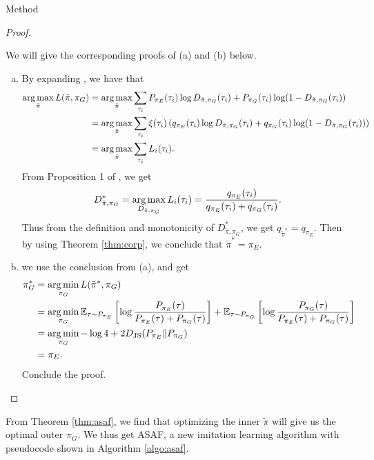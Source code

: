 \documentclass[10pt,aspectratio=169]{beamer}
\begin{document}
\begin{frame}{Method}
\begin{proof}
\begin{enumerate}[(a)]
		\end{enumerate}
		We will give the corresponding proofs of (a) and (b) below.
		\begin{enumerate}[(a)]
			\item By expanding , we have that
			      \[
				      \begin{aligned}
					      \operatorname*{arg\,max}_{\tilde{\pi}} L(\tilde{\pi}, \pi_G)
					       & = \operatorname*{arg\,max}_{\tilde{\pi}} \sum_{\tau_i} P_{\pi_E}(\tau_i)\log D_{\tilde{\pi}, \pi_G}(\tau_i) + P_{\pi_G}(\tau_i)\log(1-D_{\tilde{\pi}, \pi_G}(\tau_i))                         \\
					       & = \operatorname*{arg\,max}_{\tilde{\pi}} \sum_{\tau_i} \xi(\tau_i)\left(q_{\pi_E}(\tau_i)\log D_{\tilde{\pi}, \pi_G}(\tau_i) + q_{\pi_G}(\tau_i)\log(1-D_{\tilde{\pi}, \pi_G}(\tau_i))\right) \\
					       & = \operatorname*{arg\,max}_{\tilde{\pi}} \sum_{\tau_i} L_i(\tau_i).
				      \end{aligned}
			      \]
			      From Proposition 1 of \citep{gan}, we get
			      \[
				      D_{\tilde{\pi}, \pi_G}^* = \operatorname*{arg\,max}_{D_{\tilde{\pi}, \pi_G}}L_i(\tau_i) = \frac{q_{\pi_E}(\tau_i)}{q_{\pi_E}(\tau_i) + q_{\pi_G}(\tau_i)}.
			      \]
			      Thus from the definition and monotonicity of $D_{\tilde{\pi}, \pi_G}^*$, we get $q_{\tilde{\pi}^*} = q_{\pi_E}$. Then by using Theorem \ref{thm:corp}, we conclude that $\tilde{\pi}^* = \pi_E$.
			\item we use the conclusion from (a), and get
			      \[
				      \begin{aligned}
					      \pi_G^*
					       & = \operatorname*{arg\,min}_{\pi_G} L(\tilde{\pi}^*, \pi_G)                                                                                                                                                                                                 \\
					       & = \operatorname*{arg\,min}_{\pi_G} \mathbb{E}_{\tau\sim P_{\pi_E}}\left[\log \frac{P_{\pi_E}(\tau)}{P_{\pi_E}(\tau) + P_{\pi_G}(\tau)}\right] + \mathbb{E}_{\tau\sim P_{\pi_G}}\left[\log \frac{P_{\pi_G}(\tau)}{P_{\pi_E}(\tau) + P_{\pi_G}(\tau)}\right] \\
					       & = \operatorname*{arg\,min}_{\pi_G}-\log 4 + 2D_\text{JS}(P_{\pi_E}\|P_{\pi_G})                                                                                                                                                                             \\
					       & = \pi_E.
				      \end{aligned}
			      \]
			      Conclude the proof.
		\end{enumerate}
	\end{proof}
	From Theorem \ref{thm:asaf}, we find that optimizing the inner $\tilde{\pi}$ will give us the optimal outer $\pi_G$. We thus get ASAF, a new imitation learning algorithm with pseudocode shown in Algorithm \ref{algo:asaf}.


\end{frame}
\end{document}
